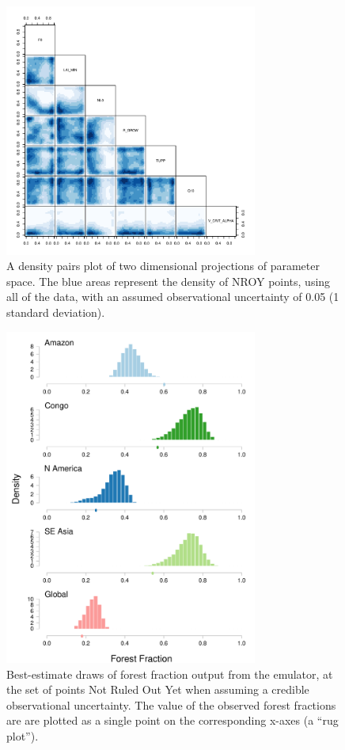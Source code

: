 \documentclass[esd, article]{copernicus} %
\begin{document}
\begin{figure}[t]
\includegraphics[width=8.3cm]{graphics/credible_NROY.pdf}
\caption{A density pairs plot of two dimensional projections of parameter space. The blue areas represent the density of NROY points, using all of the data, with an assumed observational uncertainty of 0.05 (1 standard deviation).}
\label{fig:credible_NROY}
\end{figure}

\begin{figure}[t]
\includegraphics[width=8.3cm]{graphics/credible_NROY_hists.pdf}
\caption{Best-estimate draws of forest fraction output from the emulator, at the set of points Not Ruled Out Yet when assuming a credible observational uncertainty. The value of the observed forest fractions are are plotted as a single point on the corresponding x-axes (a ``rug plot'').}
\label{fig:credible_NROY_hists}
\end{figure}
\end{document}
